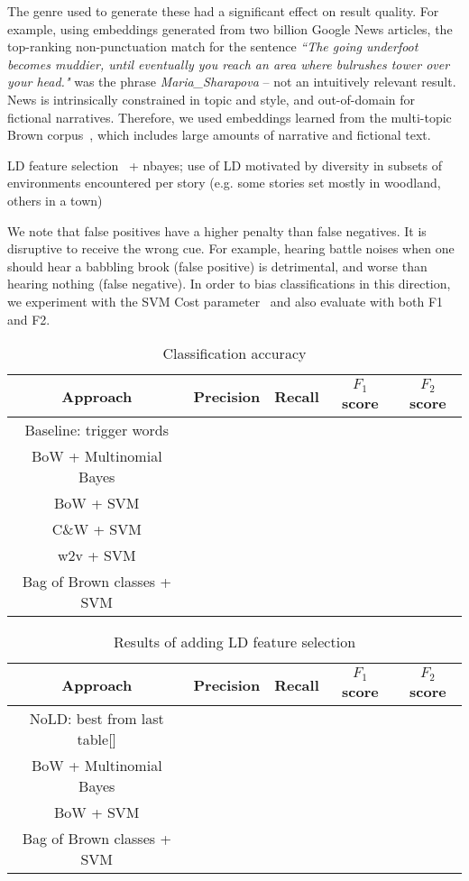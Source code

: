 \documentclass[11pt]{article}
\begin{document}
The genre used to generate these had a significant effect on result quality.
For example, using embeddings generated from two billion Google News articles, the top-ranking non-punctuation match for the sentence \emph{``The going underfoot becomes muddier, until eventually you reach an area where bulrushes tower over your head."} was the phrase {\em Maria\_Sharapova} -- not an intuitively relevant result.
News is intrinsically constrained in topic and style, and out-of-domain for fictional narratives.
Therefore, we used embeddings learned from the multi-topic Brown corpus~\cite{francis1979brown}, which includes large amounts of narrative and fictional text.

LD feature selection~\cite{lui2011cross} + nbayes; use of LD motivated by diversity in subsets of environments encountered per story (e.g. some stories set mostly in woodland, others in a town)

We note that false positives have a higher penalty than false negatives.
It is disruptive to receive the wrong cue.
For example, hearing battle noises when one should hear a babbling brook (false positive) is detrimental, and worse than hearing nothing (false negative).
In order to bias classifications in this direction, we experiment with the SVM Cost parameter~\cite{morik1999combining} and also evaluate with both F1 and F2.



\begin{table*}
\centering
\footnotesize
\begin{tabular}{c|cccc}
\hline
{\bf Approach} & {\bf Precision} & {\bf Recall} & {\bf $F_1$ score} & {\bf $F_2$ score} \\
\hline
Baseline: trigger words &&&& \\
BoW + Multinomial Bayes &&&& \\
BoW + SVM &&&& \\
C\&W + SVM &&&& \\
w2v + SVM &&&& \\
Bag of Brown classes + SVM &&&& \\
\hline
\end{tabular}
\caption{Classification accuracy}
\label{ref:results-main}
\end{table*}

\begin{table*}
\centering
\footnotesize
\begin{tabular}{c|cccc}
\hline
{\bf Approach} & {\bf Precision} & {\bf Recall} & {\bf $F_1$ score} & {\bf $F_2$ score} \\
\hline
NoLD: best from last table[] &&&& \\
BoW + Multinomial Bayes &&&& \\
BoW + SVM &&&& \\
Bag of Brown classes + SVM &&&& \\
\hline
\end{tabular}
\caption{Results of adding LD feature selection}
\label{ref:ld-selection}
\end{table*}
\end{document}
